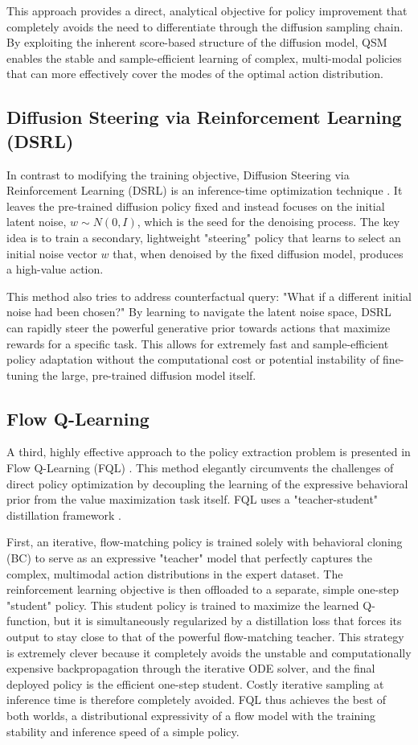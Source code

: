 This approach provides a direct, analytical objective for policy improvement that completely avoids the need to differentiate through the diffusion sampling chain. By exploiting the inherent score-based structure of the diffusion model, QSM enables the stable and sample-efficient learning of complex, multi-modal policies that can more effectively cover the modes of the optimal action distribution.


\subsection{Diffusion Steering via Reinforcement Learning (DSRL)}
In contrast to modifying the training objective, Diffusion Steering via Reinforcement Learning (DSRL) is an inference-time optimization technique \cite{wagenmakerSteeringYourDiffusion2025b}. It leaves the pre-trained diffusion policy fixed and instead focuses on the initial latent noise,  $w∼N(0,I)$, which is the seed for the denoising process. The key idea is to train a secondary, lightweight "steering" policy that learns to select an initial noise vector $w$ that, when denoised by the fixed diffusion model, produces a high-value action.

This method also tries to address counterfactual query: "What if a different initial noise had been chosen?" By learning to navigate the latent noise space, DSRL can rapidly steer the powerful generative prior towards actions that maximize rewards for a specific task. This allows for extremely fast and sample-efficient policy adaptation without the computational cost or potential instability of fine-tuning the large, pre-trained diffusion model itself.


\subsection{Flow Q-Learning}
A third, highly effective approach to the policy extraction problem is presented in Flow Q-Learning (FQL) \cite{parkFlowQLearning2025}. This method elegantly circumvents the challenges of direct policy optimization by decoupling the learning of the expressive behavioral prior from the value maximization task itself. FQL uses a "teacher-student" distillation framework \cite{hintonDistillingKnowledgeNeural2015}. 

First, an iterative, flow-matching policy is trained solely with behavioral cloning (BC) to serve as an expressive "teacher" model that perfectly captures the complex, multimodal action distributions in the expert dataset. The reinforcement learning objective is then offloaded to a separate, simple one-step "student" policy. This student policy is trained to maximize the learned Q-function, but it is simultaneously regularized by a distillation loss that forces its output to stay close to that of the powerful flow-matching teacher. This strategy is extremely clever because it completely avoids the unstable and computationally expensive backpropagation through the iterative ODE solver, and the final deployed policy is the efficient one-step student. Costly iterative sampling at inference time is therefore completely avoided. FQL thus achieves the best of both worlds, a distributional expressivity of a flow model with the training stability and inference speed of a simple policy.
